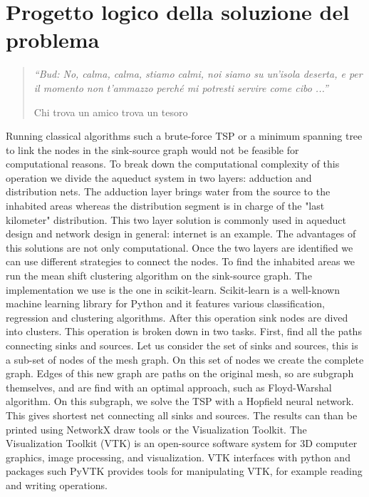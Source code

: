 \chapter{Progetto logico della soluzione del problema}
\label{capitolo4}
\thispagestyle{empty}

\begin{quotation}
{\footnotesize
\noindent \emph{``Bud: No, calma, calma, stiamo calmi, noi siamo su un'isola deserta, e per il momento non t'ammazzo perch\'e mi potresti servire come cibo ...''}
\begin{flushright}
Chi trova un amico trova un tesoro
\end{flushright}
}
\end{quotation}
\vspace{0.5cm}

\noindent Running classical algorithms such a brute-force TSP or a minimum spanning tree to link
the nodes in the sink-source graph would not be feasible for computational reasons. To
break down the computational complexity of this operation we divide the aqueduct system
in two layers: adduction and distribution nets. The adduction layer brings water from the
source to the inhabited areas whereas the distribution segment is in charge of the "last
kilometer" distribution. This two layer solution is commonly used in aqueduct design and
network design in general: internet is an example. The advantages of this solutions are
not only computational. Once the two layers are identified we can use different strategies
to connect the nodes.
To find the inhabited areas we run the mean shift clustering algorithm on the sink-source
graph. The implementation we use is the one in scikit-learn. Scikit-learn is a well-known
machine learning library for Python and it features various classification, regression and
clustering algorithms. After this operation sink nodes are dived into clusters.
This operation is broken down in two tasks. First, find all the paths connecting sinks
and sources. Let us consider the set of sinks and sources, this is a sub-set of nodes of the
mesh graph. On this set of nodes we create the complete graph. Edges of this new graph
are paths on the original mesh, so are subgraph themselves, and are find with an optimal
approach, such as Floyd-Warshal algorithm. On this subgraph, we solve the TSP with a
Hopfield neural network. This gives shortest net connecting all sinks and sources.
The results can than be printed using NetworkX draw tools or the Visualization Toolkit.
The Visualization Toolkit (VTK) is an open-source software system for 3D computer
graphics, image processing, and visualization. VTK interfaces with python and packages
such PyVTK provides tools for manipulating VTK, for example reading and writing
operations.
